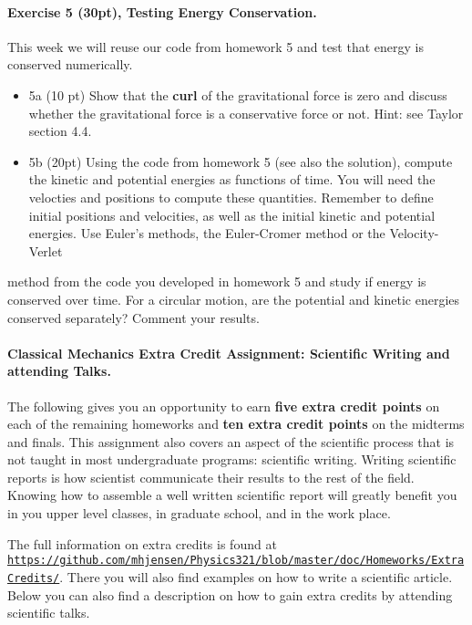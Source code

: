 \documentclass[%
oneside,                 %
final,                   %
10pt]{article}
\begin{document}
\noindent
\paragraph{Exercise 5 (30pt), Testing Energy Conservation.}
This week we will reuse our code from homework 5 and test that energy is conserved numerically.

\begin{itemize}
\item 5a (10 pt) Show that the \textbf{curl} of the gravitational force is zero and discuss whether the gravitational force is  a conservative force or not. Hint: see Taylor section 4.4.

\item 5b (20pt) Using the code from homework 5 (see also the solution), compute the kinetic and potential energies as functions of time. You will need the velocties and positions to compute these quantities. Remember to define initial positions and velocities, as well as the  initial kinetic and potential energies. Use Euler's methods, the Euler-Cromer method or the Velocity-Verlet
\end{itemize}

\noindent
method from the code you developed in homework 5 and study if energy is conserved over time. For a circular motion, are the potential and kinetic energies conserved separately? Comment your results.




\paragraph{Classical Mechanics Extra Credit Assignment: Scientific Writing and attending Talks.}
The following gives you an opportunity to earn \textbf{five extra credit
points} on each of the remaining homeworks and \textbf{ten extra credit points}
on the midterms and finals.  This assignment also covers an aspect of
the scientific process that is not taught in most undergraduate
programs: scientific writing.  Writing scientific reports is how
scientist communicate their results to the rest of the field.  Knowing
how to assemble a well written scientific report will greatly benefit
you in you upper level classes, in graduate school, and in the work
place.

The full information on extra credits is found at \href{{https://github.com/mhjensen/Physics321/blob/master/doc/Homeworks/ExtraCredits/}}{\nolinkurl{https://github.com/mhjensen/Physics321/blob/master/doc/Homeworks/ExtraCredits/}}. There you will also find examples on how to write a scientific article. 
Below you can also find a description on how to gain extra credits by attending scientific talks.
\end{document}
